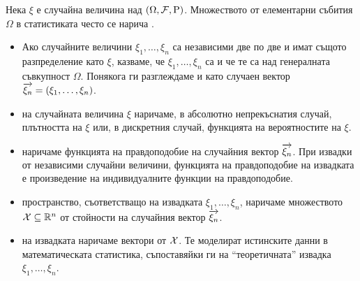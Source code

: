 \documentclass[numbers=endperiod, bibliography=totocnumbered]{scrartcl}
\begin{document}
\begin{definition}[Извадки]
  Нека \( \xi \) е случайна величина над \( (\Omega, \mathcal{F}, \operatorname{P}) \). Множеството от елементарни събития \( \Omega \) в статистиката често се нарича .

  \begin{itemize}
    \item Ако случайните величини \( \xi_1, \ldots, \xi_n \) са независими две по две и имат същото разпределение като \( \xi \), казваме, че \( \xi_1, \ldots, \xi_n \) са  и че те са  над генералната съвкупност \( \Omega \). Понякога ги разглеждаме и като случаен вектор \( \overrightarrow{\xi_n} = (\xi_1, \ldots, \xi_n) \).
    \item {} на случайната величина \( \xi \) наричаме, в абсолютно непрекъснатия случай, плътността на \( \xi \) или, в дискретния случай, функцията на вероятностите на \( \xi \).
    \item {} наричаме функцията на правдоподобие на случайния вектор \( \overrightarrow{\xi_n} \). При извадки от независими случайни величини, функцията на правдоподобие на извадката е произведение на индивидуалните функции на правдоподобие.
    \item {} пространство, съответстващо на извадката \( \xi_1, \ldots, \xi_n \), наричаме множеството \( \mathcal{X} \subseteq \mathbb{R}^n \) от стойности на случайния вектор \( \overrightarrow{\xi_n} \).
    \item {} на извадката наричаме вектори от \( \mathcal{X} \). Те моделират истинските данни в математическата статистика, съпоставяйки ги на \enquote{теоретичната} извадка \( \xi_1, \ldots, \xi_n \).
  \end{itemize}
\end{definition}
\end{document}
